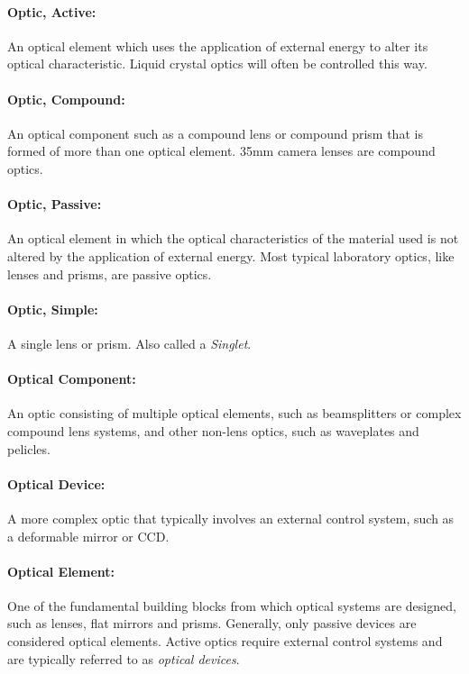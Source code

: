 \documentclass[11pt]{article}
\begin{document}
\paragraph{Optic, Active:}
An optical element which uses the application of external energy to alter its optical characteristic. Liquid crystal optics will often be controlled this way.
\vspace{-10pt}
\paragraph{Optic, Compound:}
An optical component such as a compound lens or compound prism that is formed of more than one optical element. 35mm camera lenses are compound optics.
\vspace{-10pt}
\paragraph{Optic, Passive:} An optical element in which the optical characteristics of the material used is not altered by the application of external energy. Most typical laboratory optics, like lenses and prisms, are passive optics.
\vspace{-10pt}
\paragraph{Optic, Simple:} 
A single lens or prism. Also called a \textit{Singlet}.
\vspace{-10pt}
\paragraph{Optical Component:}
An optic consisting of multiple optical elements, such as beamsplitters or complex compound lens systems, and other non-lens optics, such as waveplates and pelicles. 
\vspace{-10pt}
\paragraph{Optical Device:} 
A more complex optic that typically involves an external control system, such as a deformable mirror or CCD.
\vspace{-10pt}
\paragraph{Optical Element:} 
One of the fundamental building blocks from which optical systems are designed, such as lenses, flat mirrors and prisms. Generally, only passive devices are considered optical elements. Active optics require external control systems and are typically referred to as \textit{optical devices}.
\vspace{-10pt}
\end{document}
